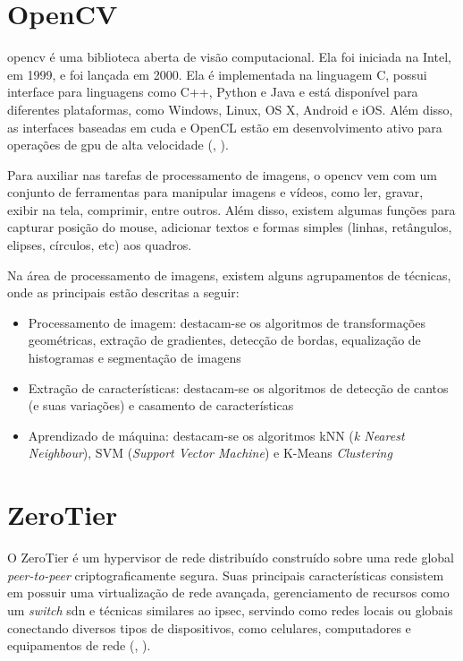 \documentclass[]{politex}
\begin{document}
\section{OpenCV}
\acrfull{opencv} é uma biblioteca aberta de visão computacional. Ela foi iniciada na Intel, em 1999, e foi lançada em 2000. Ela é implementada na linguagem C, possui interface para linguagens como C++, Python e Java e está disponível para diferentes plataformas, como Windows, Linux, OS X, Android e iOS. Além disso, as interfaces baseadas em \acrshort{cuda} e OpenCL estão em desenvolvimento ativo para operações de \acrshort{gpu} de alta velocidade (, \citeyear{opencvtutorials}).

Para auxiliar nas tarefas de processamento de imagens, o \acrfull{opencv} vem com um conjunto de ferramentas para manipular imagens e vídeos, como ler, gravar, exibir na tela, comprimir, entre outros. Além disso, existem algumas funções para capturar posição do mouse, adicionar textos e formas simples (linhas, retângulos, elipses, círculos, etc) aos quadros.

Na área de processamento de imagens, existem alguns agrupamentos de técnicas, onde as principais estão descritas a seguir:
\begin{itemize}
    \item Processamento de imagem: destacam-se os algoritmos de transformações geométricas, extração de gradientes, detecção de bordas, equalização de histogramas e segmentação de imagens
    \item Extração de características: destacam-se os algoritmos de detecção de cantos (e suas variações) e casamento de características
    \item Aprendizado de máquina: destacam-se os algoritmos kNN (\textit{k Nearest Neighbour}), SVM (\textit{Support Vector Machine}) e K-Means \textit{Clustering}
\end{itemize}

\section{ZeroTier}
O ZeroTier é um hypervisor de rede distribuído construído sobre uma rede global \textit{peer-to-peer} criptograficamente segura. Suas principais características consistem em possuir uma virtualização de rede avançada, gerenciamento de recursos como um \textit{switch} \acrfull{sdn} e técnicas similares ao \acrfull{ipsec}, servindo como redes locais ou globais conectando diversos tipos de dispositivos, como celulares, computadores e equipamentos de rede (, \citeyear{zerotier}).
\end{document}
